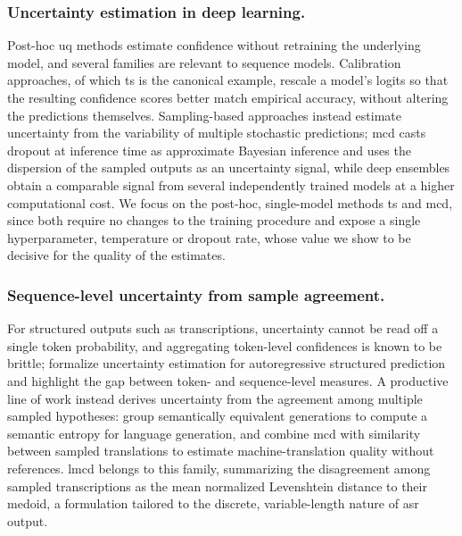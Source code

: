 \documentclass[runningheads]{llncs}
\begin{document}
\subsubsection{Uncertainty estimation in deep learning.}
Post-hoc \acrshort{uq} methods estimate confidence without retraining the underlying model, and several families are relevant to sequence models. Calibration approaches, of which \acrfull{ts} \cite{guo2017calibration} is the canonical example, rescale a model's logits so that the resulting confidence scores better match empirical accuracy, without altering the predictions themselves. Sampling-based approaches instead estimate uncertainty from the variability of multiple stochastic predictions; \acrfull{mcd} \cite{gal2016dropout} casts dropout at inference time as approximate Bayesian inference and uses the dispersion of the sampled outputs as an uncertainty signal, while deep ensembles \cite{lakshminarayanan2017simple} obtain a comparable signal from several independently trained models at a higher computational cost. We focus on the post-hoc, single-model methods \acrshort{ts} and \acrshort{mcd}, since both require no changes to the training procedure and expose a single hyperparameter, temperature or dropout rate, whose value we show to be decisive for the quality of the estimates.

\subsubsection{Sequence-level uncertainty from sample agreement.}
For structured outputs such as transcriptions, uncertainty cannot be read off a single token probability, and aggregating token-level confidences is known to be brittle; \cite{malinin2020uncertainty} formalize uncertainty estimation for autoregressive structured prediction and highlight the gap between token- and sequence-level measures. A productive line of work instead derives uncertainty from the agreement among multiple sampled hypotheses: \cite{kuhn2023semantic} group semantically equivalent generations to compute a semantic entropy for language generation, and \cite{fomicheva2020unsupervised} combine \acrshort{mcd} with similarity between sampled translations to estimate machine-translation quality without references. \acrshort{lmcd} belongs to this family, summarizing the disagreement among sampled transcriptions as the mean normalized Levenshtein distance to their medoid, a formulation tailored to the discrete, variable-length nature of \acrshort{asr} output.
\end{document}
